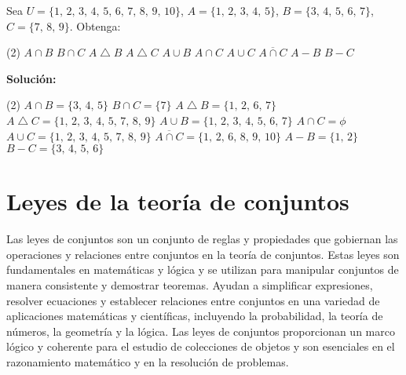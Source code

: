 \begin{myexample}
    Sea $U = \{ 1, \, 2, \, 3, \, 4, \, 5, \, 6, \, 7, \, 8, \, 9, \, 10 \}$, $A = \{ 1, \, 2, \, 3, \, 4, \, 5 \}$, $B = \{ 3, \, 4, \, 5, \, 6, \, 7 \}$, $C = \{ 7, \, 8, \, 9 \}$. Obtenga:
    \begin{tasks}(2)
        \task $A \cap B$
        \task $B \cap C$
        \task $A \bigtriangleup B$
        \task $A \bigtriangleup C$
        \task $A \cup B$
        \task $A \cap C$
        \task $A \cup C$
        \task $\overline{A \cap C}$
        \task $A - B$
        \task $B - C$
    \end{tasks}

    \tcblower
    \textbf{\color{jblueleft}Solución:}
    \begin{tasks}(2)
        \task $A \cap B = \{ 3, \, 4, \, 5 \}$
        \task $B \cap C = \{ 7 \}$
        \task $A \bigtriangleup B = \{ 1, \, 2, \, 6, \, 7 \}$
        \task $A \bigtriangleup C = \{ 1, \, 2, \, 3, \, 4, \, 5, \, 7, \, 8, \, 9 \}$
        \task $A \cup B = \{ 1, \, 2, \, 3, \, 4, \, 5, \, 6, \, 7 \}$
        \task $A \cap C = \phi$
        \task $A \cup C = \{ 1, \, 2, \, 3, \, 4, \, 5, \, 7, \, 8, \, 9 \}$
        \task $\overline{A \cap C} = \{ 1, \, 2, \, 6, \, 8, \, 9, \, 10 \}$
        \task $A - B = \{ 1, \, 2 \}$
        \task $B - C = \{ 3, \, 4, \, 5, \, 6 \}$
    \end{tasks}
\end{myexample}

\newpage

\section{Leyes de la teoría de conjuntos}

Las leyes de conjuntos son un conjunto de reglas y propiedades que gobiernan las operaciones y relaciones entre conjuntos en la teoría de conjuntos. Estas leyes son fundamentales en matemáticas y lógica y se utilizan para manipular conjuntos de manera consistente y demostrar teoremas. Ayudan a simplificar expresiones, resolver ecuaciones y establecer relaciones entre conjuntos en una variedad de aplicaciones matemáticas y científicas, incluyendo la probabilidad, la teoría de números, la geometría y la lógica. Las leyes de conjuntos proporcionan un marco lógico y coherente para el estudio de colecciones de objetos y son esenciales en el razonamiento matemático y en la resolución de problemas.\\


